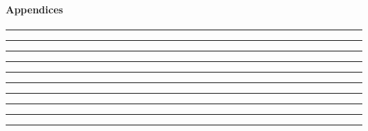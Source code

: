 \documentclass{article}
\begin{document}
\newpage

\paragraph{Appendices}



\rule{\textwidth}{1pt}



\rule{\textwidth}{1pt}

\newpage



\rule{\textwidth}{1pt}



\rule{\textwidth}{1pt}



\rule{\textwidth}{1pt}



\rule{\textwidth}{1pt}



\rule{\textwidth}{1pt}



\rule{\textwidth}{1pt}



\rule{\textwidth}{1pt}



\rule{\textwidth}{1pt}
\end{document}
